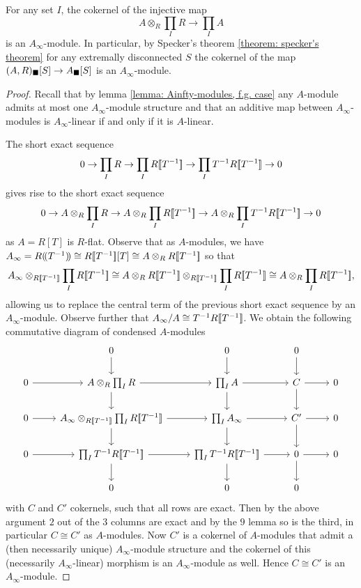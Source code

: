 \begin{lemma}
	\label{lemma: special cokernels are Ainfty-modules, f.g. case}
	
	For any set $I$, the cokernel of the injective map
	$$A\otimes_R \prod_I R \to \prod_I A$$
	is an $A_\infty$-module. In particular, by Specker's theorem \ref{theorem: specker's theorem} for any extremally disconnected $S$ the cokernel of the map ${(A, R)_\blacksquare[S]} \to {A_\blacksquare[S]}$ is an $A_\infty$-module.
\end{lemma}
\begin{proof}
	Recall that by lemma \ref{lemma: Ainfty-modules, f.g. case} any $A$-module admits at most one $A_\infty$-module structure and that an additive map between $A_\infty$-modules is $A_\infty$-linear if and only if it is $A$-linear.
	
	The short exact sequence
		$$0\to \prod_I R\to\prod_I {R[\![T^{-1}]\!]} \to \prod_I T^{-1}{R[\![T^{-1}]\!]}\to 0$$
	gives rise to the short exact sequence
		$$0\to A\otimes_R \prod_I R\to A\otimes_R \prod_I {R[\![T^{-1}]\!]} \to A\otimes_R \prod_I T^{-1}{R[\![T^{-1}]\!]} \to 0$$
	as $A=R[T]$ is $R$-flat. Observe that as $A$-modules, we have $A_\infty = {R(\!(T^{-1})\!)} \cong {R[\![T^{-1}]\!]}[T] \cong A \otimes_R {R[\![T^{-1}]\!]}$ so that
		$$A_\infty \otimes_{\series{R}{T^{-1}}} \prod_I \series{R}{T^{-1}}\cong A\otimes_R \series{R}{T^{-1}}\otimes_{\series{R}{T^{-1}}} \prod_I \series{R}{T^{-1}}\cong A\otimes_R \prod_I \series{R}{T^{-1}},$$
	allowing us to replace the central term of the previous short exact sequence by an $A_\infty$-module.	Observe further that $A_\infty/A \cong T^{-1}{R[\![T^{-1}]\!]}$. We obtain the following commutative diagram of condensed $A$-modules
	$$\begin{tikzcd}
		&0\ar[d] &0\ar[d] &0\ar[d]\\
		0\ar[r] &A\otimes_R \prod_I R \ar[r]\ar[d] &\prod_I A\ar[r]\ar[d] &C \ar[r]\ar[d] &0\\
		0\ar[r] &A_\infty\otimes_{\series{R}{T^{-1}}} \prod_I \series R {T^{-1}} \ar[r]\ar[d] &\prod_I A_\infty \ar[r]\ar[d] &C' \ar[r]\ar[d] &0\\
		0 \ar[r] &\prod_I T^{-1}\series R{T^{-1}} \ar[r]\ar[d] &\prod_I T^{-1}\series{R}{T^{-1}} \ar[r]\ar[d] &0 \ar[r]\ar[d] &0\\
		&0 &0 &0
	\end{tikzcd}$$
	with $C$ and $C'$ cokernels, such that all rows are exact. Then by the above argument $2$ out of the $3$ columns are exact and by the $9$ lemma so is the third, in particular $C\cong C'$ as $A$-modules. Now $C'$ is a cokernel of $A$-modules that admit a (then necessarily unique) $A_\infty$-module structure and the cokernel of this (necessarily $A_\infty$-linear) morphism is an $A_\infty$-module as well. Hence $C\cong C'$ is an $A_\infty$-module.
\end{proof}


